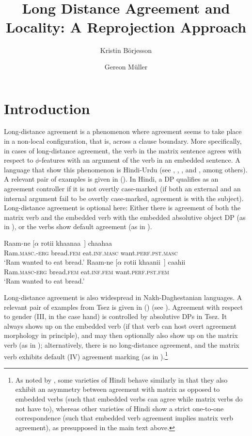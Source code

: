 \documentclass[output=paper
,modfonts
,nonflat]{langsci/langscibook}
\title{Long Distance Agreement and Locality: A Reprojection Approach}
\author{Kristin B\"orjesson\affiliation{Universit{\"a}t Leipzig}\and Gereon M\"uller\affiliation{Universit\"at Leipzig}}
\begin{document}
\maketitle

\newcommand{\refprefix}{ex:mueller:}
\section{Introduction}

Long-distance agreement is a phenomenon where agreement seems to take
place in a non-local configuration, that is, across a clause boundary.
More specifically, in cases of long-distance agreement, the verb in
the matrix sentence agrees with respect to $\phi$-features with an
argument of the verb in an embedded sentence. A language that show
this phenomenon is Hindi-Urdu (see \cite{Mahajan:90},
\cite{Butt:95,Butt:08}, \cite{Bhatt:05}, and \cite{Chandra:05}, among
others). A relevant pair of examples is given in (\Next). In Hindi, a DP
qualifies as an agreement controller if it is not overtly case-marked (if
both an external and an internal argument fail to be overtly
case-marked, agreement is with the subject). Long-distance agreement
is optional here: Either there is agreement of both the matrix verb
and the embedded verb with the embedded absolutive object DP (as in
\Next[b]), or the verbs show default agreement (as in \Next[a]).

\ea\label{ex:mueller:1}
\ea 
\gll  Raam-ne [$\alpha$ rotii khaanaa~] chaahaa \\ 
      Ram.{\scshape masc}.-{\scshape erg} {} bread.{\scshape fem} eat.{\scshape inf}.{\scshape masc} want.{\scshape perf.pst.masc} \\ 
\glt  `Ram wanted to eat bread.'
\ex 
\gll Raam-ne [$\alpha$ rotii khaanii~] caahii \\ 
     Ram.{\scshape masc}-{\scshape erg} {} bread.{\scshape fem} eat.{\scshape inf}.{\scshape fem} want.{\scshape perf.pst.fem} \\ 
\glt `Ram wanted to eat bread.'
\z
\z

Long-distance agreement is also widespread in Nakh-Daghestanian
languages. A relevant pair of examples from Tsez is given in (\Next)
(see \cite{Polinsky&Potsdam:01}). Agreement with respect to gender
(III, in the case hand) is controlled by
absolutive DPs in Tsez. It always shows up on the embedded verb (if
that verb can host overt agreement morphology in principle), and may
then optionally also show up on the matrix verb (as in \Next[b]);
alternatively, there is no long-distance agreement, and the matrix
verb exhibits default (IV) agreement marking (as in \Next[a]).\footnote{As
  noted by \cite{Bhatt:05}, some varieties of Hindi behave similarly
  in that they also exhibit an asymmetry between agreement with matrix
  as opposed to embedded verbs (such that embedded verbs can agree
  while matrix verbs do not have to), whereas other varieties of Hindi show a
  strict one-to-one correspondence (such that embedded verb agreement
  implies matrix verb agreement), as presupposed in the main text above.}
\end{document}
